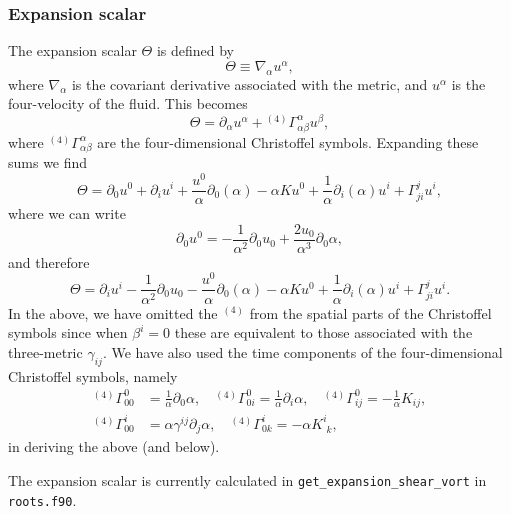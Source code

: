 \documentclass[a4paper]{article}
\newcommand{\ph}{\phantom}
\newcommand{\alp}{\alpha}
\newcommand{\Gam}{\Gamma}
\newcommand{\gam}{\gamma}
\newcommand{\pd}{\partial}
\begin{document}
\subsubsection{Expansion scalar}

The expansion scalar $\Theta$ is defined by
\begin{equation}\label{eq:expansion_scalar_defn}
	\Theta \equiv \nabla_\alp u^\alp,
\end{equation}
where $\nabla_\alp$ is the covariant derivative associated with the metric, and $u^\alp$ is the four-velocity of the fluid. This becomes
\begin{equation}
	\Theta = \pd_\alp u^\alp + {}^{(4)}\Gam^\alp_{\alp\beta} u^\beta,
\end{equation}
where ${}^{(4)}\Gam^\alp_{\alp\beta}$ are the four-dimensional Christoffel symbols. Expanding these sums we find 
\begin{equation}
	\Theta = \pd_0 u^0 + \pd_i u^i + \frac{u^0}{\alp} \pd_0 ( \alp ) - \alp K u^0 +   \frac{1}{\alp} \pd_i ( \alp ) u^i + \Gam^j_{ji} u^i,
\end{equation}
where we can write
\begin{equation}\label{eq:pd0u0}
	\pd_0 u^0 = - \frac{1}{\alp^2} \pd_0 u_0 + \frac{2u_0}{\alp^3} \pd_0 \alp,
\end{equation}
and therefore
\begin{equation}
	\Theta = \pd_i u^i - \frac{1}{\alp^2} \pd_0 u_0 - \frac{u^0 }{\alp} \pd_0 ( \alp )- \alp K u^0 +   \frac{1}{\alp} \pd_i ( \alp ) u^i + \Gam^j_{ji} u^i.
\end{equation}
In the above, we have omitted the ${}^{(4)}$ from the spatial parts of the Christoffel symbols since when $\beta^i=0$ these are equivalent to those associated with the three-metric $\gam_{ij}$. We have also used the time components of the four-dimensional Christoffel symbols, namely
\begin{align}
	{}^{(4)}\Gamma^0_{00} &= \frac{1}{\alp}\pd_0 \alp, \quad {}^{(4)}\Gamma^0_{0i} = \frac{1}{\alp}\pd_i\alp, \quad {}^{(4)}\Gamma^0_{ij} = - \frac{1}{\alp} K_{ij}, \\
	{}^{(4)}\Gamma^i_{00} &= \alp \gam^{ij} \pd_j \alp, \quad {}^{(4)}\Gamma^i_{0k} = -\alp K^i_{\ph{i}k},
\end{align}
in deriving the above (and below).

The expansion scalar is currently calculated in \texttt{get\_expansion\_shear\_vort} in \texttt{roots.f90}.
\end{document}
